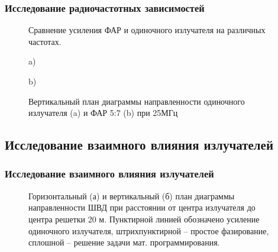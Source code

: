 \begin{frame}
    \frametitle{Исследование радиочастотных зависимостей}
\begin{figure}
\label{ris:paa_gains}
\caption{Сравнение усиления ФАР и одиночного излучателя на различных частотах.}
\end{figure}

\begin{figure}
\begin{minipage}[h]{0.4\linewidth}
 a)
\end{minipage}
\hfill
\begin{minipage}[h]{0.4\linewidth}
 b)
\end{minipage}
\caption{Вертикальный план диаграммы направленности одиночного излучателя (a) и ФАР 5:7 (b) при 25МГц}
\label{ris:25MHz}
\end{figure}
\end{frame}


\subsection{Исследование взаимного влияния излучателей}
\begin{frame}
    \frametitle{Исследование взаимного влияния излучателей}
    \begin{figure}
    \begin{minipage}[h]{0.49\linewidth}
    \end{minipage}
    \hfill
    \begin{minipage}[h]{0.49\linewidth}
    \end{minipage}
    \caption{Горизонтальный (а) и вертикальный (б) план диаграммы направленности ШВД при расстоянии от центра излучателя до центра решетки 20 м. Пунктирной линией обозначено усиление одиночного излучателя, штрихпунктирной – простое фазирование, сплошной – решение задачи мат. программирования.}
    \label{pic:r_bvd_result}
    \end{figure}

\end{frame}
